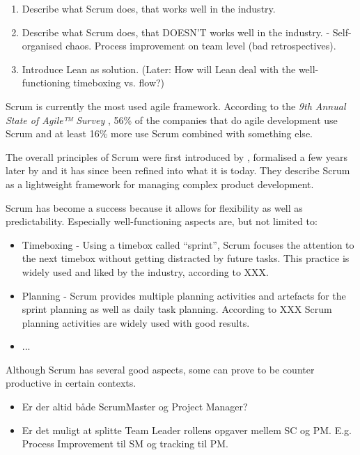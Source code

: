 \begin{enumerate}
	\item Describe what Scrum does, that works well in the industry.
	\item Describe what Scrum does, that DOESN'T works well in the industry. - Self-organised chaos. Process improvement on team level (bad retrospectives).
	\item Introduce Lean as solution. (Later: How will Lean deal with the well-functioning timeboxing vs. flow?)
\end{enumerate}

Scrum is currently the most used agile framework. According to the \textit{9th Annual State of Agile™ Survey} \citep{VersionOne}, 56\% of the companies that do agile development use Scrum and at least 16\% more use Scrum combined with something else.

The overall principles of Scrum were first introduced by \citet{Takeuchi1986}, formalised a few years later by \citet{Schwaber} and it has since been refined into what it is today.
They describe Scrum as a lightweight framework for managing complex product development. 

Scrum has become a success because it allows for flexibility as well as predictability.
Especially well-functioning aspects are, but not limited to:
\begin{itemize}
	\item Timeboxing - Using a timebox called “sprint”, Scrum focuses the attention to the next timebox without getting distracted by future tasks. This practice is widely used and liked by the industry, according to XXX.
	\item Planning - Scrum provides multiple planning activities and artefacts for the sprint planning as well as daily task planning. According to XXX Scrum planning activities are widely used with good results.
	\item ...
\end{itemize}

Although Scrum has several good aspects, some can prove to be counter productive in certain contexts.
 
 
 
\begin{itemize}
	\item Er der altid både ScrumMaster og Project Manager?
	\item Er det muligt at splitte Team Leader rollens opgaver mellem SC og PM. E.g. Process Improvement til SM og tracking til PM.
\end{itemize}








